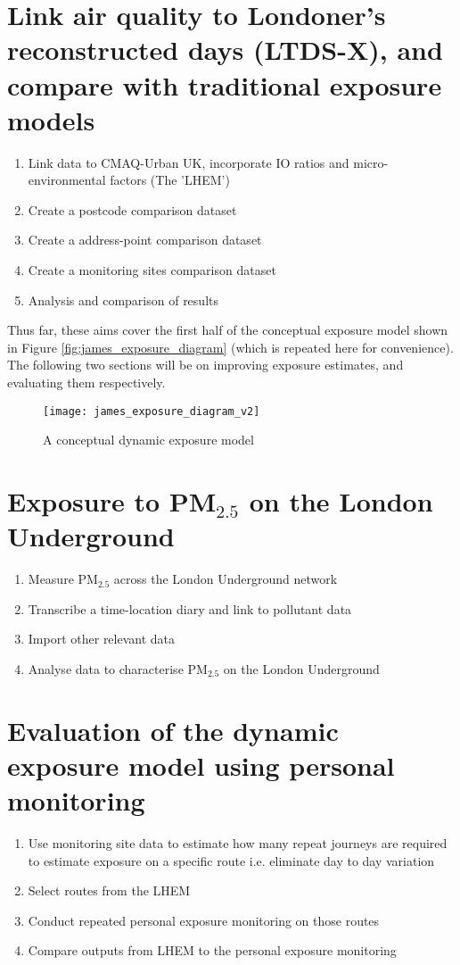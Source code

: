 \section{Link  air  quality  to  Londoner's  reconstructed  days (LTDS-X),  and  compare  with traditional exposure models }

\begin{enumerate}
\item Link data to CMAQ-Urban UK, incorporate IO ratios and micro-environmental factors (The 'LHEM')
\item Create a postcode comparison dataset
\item Create a address-point comparison dataset
\item Create a monitoring sites comparison dataset
\item Analysis and comparison of results
\end{enumerate}

Thus far, these aims cover the first half of the conceptual exposure model shown in Figure \ref{fig:james_exposure_diagram} (which is repeated here for convenience). The following two sections will be on improving exposure estimates, and evaluating them respectively.

\begin{figure}[H]
\centering
\texttt{[image: james\_exposure\_diagram\_v2]}
\caption{A conceptual dynamic exposure model}
\label{fig:james_exposure_diagram_v2}
\end{figure}

\section{Exposure to \texorpdfstring{PM$_{2.5}$}{} on the London Underground}

\begin{enumerate}
\item Measure PM$_{2.5}$ across the London Underground network
\item Transcribe a time-location diary and link to pollutant data
\item Import other relevant data
\item Analyse data to characterise PM$_{2.5}$ on the London Underground
\end{enumerate}

\section{Evaluation of the dynamic exposure model using personal monitoring}

\begin{enumerate}
\item Use monitoring site data to estimate how many repeat journeys are required to estimate exposure on a specific route i.e. eliminate day to day variation
\item Select routes from the LHEM
\item Conduct repeated personal exposure monitoring on those routes
\item Compare outputs from LHEM to the personal exposure monitoring
\end{enumerate} 